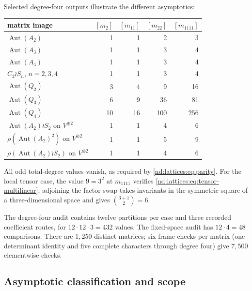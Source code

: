 \documentclass[10pt]{article}
\newcommand{\Aut}{\operatorname{Aut}}
\begin{document}
Selected degree-four outputs illustrate the different asymptotics:
\begin{center}
\small
\begin{tabular}{@{}lrrrr@{}}\toprule
matrix image & $[m_2]$ & $[m_{11}]$ & $[m_{22}]$ & $[m_{1111}]$\\\midrule
$\Aut(A_2)$ &1&1&2&3\\
$\Aut(A_3)$ &1&1&3&4\\
$\Aut(A_4)$ &1&1&3&4\\
$C_2\wr S_n$, $n=2,3,4$ &1&1&3&4\\
$\Aut(Q_2)$ &3&4&9&16\\
$\Aut(Q_3)$ &6&9&36&81\\
$\Aut(Q_4)$ &10&16&100&256\\
$\Aut(A_2)\wr S_2$ on $V^{\oplus2}$ &1&1&4&6\\
$\rho(\Aut(A_2)^2)$ on $V^{\otimes2}$ &1&1&5&9\\
$\rho(\Aut(A_2)\wr S_2)$ on $V^{\otimes2}$ &1&1&4&6\\\bottomrule
\end{tabular}
\end{center}
All odd total-degree values vanish, as required by \eqref{nd:lattices:eq:parity}.  For
the local tensor case, the value $9=3^2$ at $m_{1111}$ verifies
\eqref{nd:lattices:eq:tensor-multilinear}; adjoining the factor swap takes invariants in
the symmetric square of a three-dimensional space and gives
$\binom{3+1}{2}=6$.

The degree-four audit contains twelve partitions per case and three recorded
coefficient routes, for $12\cdot12\cdot3=432$ values.  The fixed-space audit
has $12\cdot4=48$ comparisons.  There are $1{,}250$ distinct matrices; six
frame checks per matrix (one determinant identity and five complete
characters through degree four) give $7{,}500$ elementwise checks.

\subsection{Asymptotic classification and scope}
\end{document}
